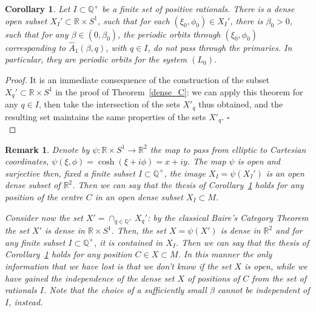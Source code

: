 \documentclass[a4paper]{article}
\newtheorem{corollary}{Corollary}
\newtheorem{remark}{Remark}
\begin{document}
\begin{corollary}
\label{dense_C_entire}
Let $I \subset {\mathbb{Q}}^+$ be a finite set of positive rationals.  There is
a dense open subset $X_I' \subset {\mathbb{R}} \times S^1$, such that for each
$(\xi_0,\phi_0)\in X_I'$, there is $\beta_0>0$, such that for any
$\beta \in (0,\beta_0)$, the periodic orbits through $(\xi_0,\phi_0)$
corresponding to $\hat{A}_1(\beta,q)$, with $q \in I$, do not pass
through the primaries. In particular, they are periodic orbits for the
system $(L_0)$.
\end{corollary}
\begin{proof}
It is an immediate consequence of the construction of the subset $X_q'
\subset {\mathbb{R}} \times S^1$ in the proof of Theorem~\ref{dense_C}: we can apply
this theorem for any $q \in I$, then take the intersection of the sets
$X'_q$ thus obtained, and the resulting set maintains the same
properties of the sets $X'_q$.  {$\square$\\}
\end{proof}

\begin{remark}
\label{XX_I}
Denote by $\psi: {\mathbb{R}} \times S^1 \rightarrow {\mathbb{R}}^2$ the map to pass from
elliptic to Cartesian coordinates, $\psi(\xi,\phi) = \cosh(\xi+i\phi)
= x+iy$.  The map $\psi$ is open and surjective then, fixed a
finite subset $I \subset {\mathbb{Q}}^+$, the image $X_I=\psi(X_I')$ is an open
dense subset of ${\mathbb{R}}^2$.  Then we can say that the thesis of
Corollary~\ref{dense_C_entire} holds for any position of the centre
$C$ in an open dense subset $X_I \subset M$.
 
Consider now the set $X'=\cap_{q \in {\mathbb{Q}}^+}X_q'$: by the classical
Baire's Category Theorem the set $X'$ is dense in ${\mathbb{R}} \times S^1$.
Then, the set $X=\psi(X')$ is dense in ${\mathbb{R}}^2$ and for any finite
subset $I\subset {\mathbb{Q}}^+$, it is contained in $X_I$.  Then we can say
that the thesis of Corollary~\ref{dense_C_entire} holds for any
position $C \in X \subset M$.  In this manner the only information
that we have lost is that we don't know if the set $X$ is open, while
we have gained the independence of the dense set $X$ of positions of
$C$ from the set of rationals $I$.  Note that the choice of a
sufficiently small $\beta$ cannot be independent of $I$, instead.
\end{remark}
\end{document}

